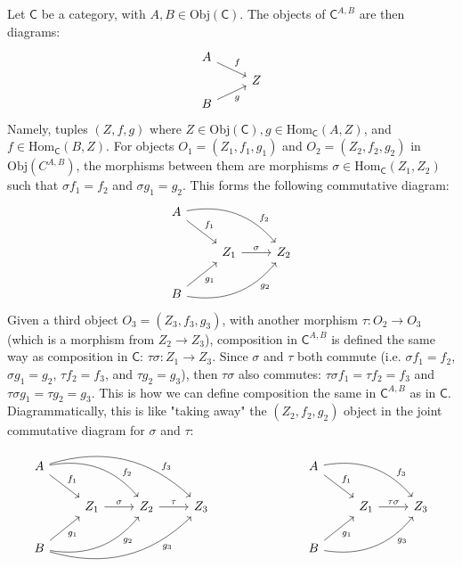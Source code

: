 \documentclass[12pt,letterpaper,boxed]{hmcpset}
\newcommand{\Obj}{\mathrm{Obj}}
\newcommand{\Hom}{\mathrm{Hom}}
\begin{document}
\begin{solution}
	Let $\mathsf{C}$ be a category, with $A,B\in\Obj(\mathsf{C})$. The objects of $\mathsf{C}^{A,B}$ are
	then diagrams:
	\[\begin{tikzcd}[row sep=tiny]
	A \arrow[dr, "f"]  &   \\
	& Z \\
	B \arrow[ur, "g"'] & 
	\end{tikzcd}\]
	Namely, tuples $(Z,f,g)$ where $Z\in\Obj(\mathsf{C}),g\in\Hom_\mathsf{C}(A,Z)$, and
	$f\in\Hom_\mathsf{C}(B,Z)$. For objects $O_1=(Z_1,f_1,g_1)$ and $O_2=(Z_2,f_2,g_2)$ in
	$\Obj(C^{A,B})$, the morphisms between them are morphisms
	$\sigma\in\Hom_\mathsf{C}(Z_1,Z_2)$ such that $\sigma f_1=f_2$ and $\sigma g_1=g_2$.
	This forms the following commutative diagram:
	\[\begin{tikzcd}
	A \arrow[dr, "f_1"] \arrow[drr, bend left, "f_2" near end]    &                               \\
	& Z_1 \arrow[r, "\sigma"] & Z_2 \\
	B \arrow[ur, "g_1"'] \arrow[urr, bend right, "g_2"' near end] &
	\end{tikzcd}\]
	Given a third object $O_3=(Z_3,f_3,g_3)$, with another morphism $\tau:O_2\to
	O_3$ (which is a morphism from $Z_2\to Z_3$), composition in $\mathsf{C}^{A,B}$ is
	defined the same way as composition in $\mathsf{C}$: $\tau\sigma:Z_1\to Z_3$. Since
	$\sigma$ and $\tau$ both commute (i.e.  $\sigma f_1=f_2$, $\sigma g_1=g_2$,
	$\tau f_2=f_3$, and $\tau g_2=g_3$), then $\tau\sigma$ also commutes: $\tau
	\sigma f_1=\tau f_2=f_3$ and $\tau \sigma g_1= \tau g_2 = g_3$. This is how we
	can define composition the same in $\mathsf{C}^{A,B}$ as in $\mathsf{C}$. Diagrammatically, this
	is like "taking away" the $(Z_2,f_2,g_2)$ object in the joint commutative
	diagram for $\sigma$ and $\tau$:
	\[
	\begin{tikzcd}
	A \arrow[dr, "f_1"] \arrow[drr, bend left, "f_2" near end] \arrow[drrr, bend left, "f_3" near end] & & \\
	& Z_1 \arrow[r, "\sigma"] & Z_2 \arrow[r, "\tau"] & Z_3 \\
	B \arrow[ur, "g_1"'] \arrow[urr, bend right, "g_2"' near end] \arrow[urrr, bend right, "g_3"' near end] & &
	\end{tikzcd}
	\hspace{1in}
	\begin{tikzcd}
	A \arrow[dr, "f_1"] \arrow[drr, bend left, "f_3" near end]    &                               \\
	& Z_1 \arrow[r, "\tau\sigma"] & Z_3 \\
	B \arrow[ur, "g_1"'] \arrow[urr, bend right, "g_3"' near end] &
	\end{tikzcd}
	\]


\end{solution}
\end{document}

